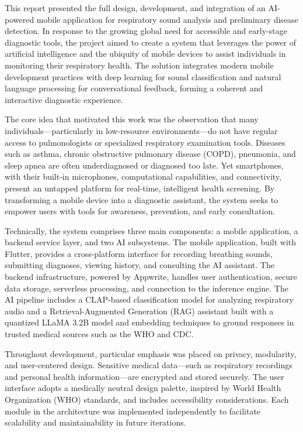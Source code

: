 
This report presented the full design, development, and integration of an AI-powered mobile application for respiratory sound analysis and preliminary disease detection. In response to the growing global need for accessible and early-stage diagnostic tools, the project aimed to create a system that leverages the power of artificial intelligence and the ubiquity of mobile devices to assist individuals in monitoring their respiratory health. The solution integrates modern mobile development practices with deep learning for sound classification and natural language processing for conversational feedback, forming a coherent and interactive diagnostic experience.

The core idea that motivated this work was the observation that many individuals—particularly in low-resource environments—do not have regular access to pulmonologists or specialized respiratory examination tools. Diseases such as asthma, chronic obstructive pulmonary disease (COPD), pneumonia, and sleep apnea are often underdiagnosed or diagnosed too late. Yet smartphones, with their built-in microphones, computational capabilities, and connectivity, present an untapped platform for real-time, intelligent health screening. By transforming a mobile device into a diagnostic assistant, the system seeks to empower users with tools for awareness, prevention, and early consultation.

Technically, the system comprises three main components: a mobile application, a backend service layer, and two AI subsystems. The mobile application, built with Flutter, provides a cross-platform interface for recording breathing sounds, submitting diagnoses, viewing history, and consulting the AI assistant. The backend infrastructure, powered by Appwrite, handles user authentication, secure data storage, serverless processing, and connection to the inference engine. The AI pipeline includes a CLAP-based classification model for analyzing respiratory audio and a Retrieval-Augmented Generation (RAG) assistant built with a quantized LLaMA 3.2B model and embedding techniques to ground responses in trusted medical sources such as the WHO and CDC.

Throughout development, particular emphasis was placed on privacy, modularity, and user-centered design. Sensitive medical data—such as respiratory recordings and personal health information—are encrypted and stored securely. The user interface adopts a medically neutral design palette, inspired by World Health Organization (WHO) standards, and includes accessibility considerations. Each module in the architecture was implemented independently to facilitate scalability and maintainability in future iterations.

